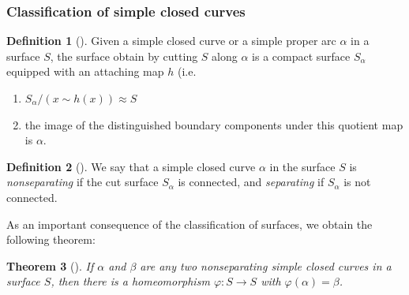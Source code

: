 \documentclass[reqno]{amsart}
\newtheorem{theorem}{Theorem}[section]
\theoremstyle{definition}
\newtheorem{definition}[theorem]{Definition}
\theoremstyle{remark}
\begin{document}
\subsubsection{Classification of simple closed curves}

\begin{definition}[]
    Given a simple closed curve or
    a simple proper arc $\alpha$ in a surface $S$,
    the surface obtain by cutting $S$ along $\alpha$ is
    a compact surface $S_{\alpha}$ equipped with an attaching
    map $h$ (i.e.
    \begin{enumerate}
        \item $S_{\alpha} / \left( x \sim h(x) \right) 
            \approx S$ 
        \item the image of the distinguished boundary components
            under this quotient map is $\alpha$.
    \end{enumerate}
\end{definition}

\begin{definition}[]
    We say that a simple closed curve $\alpha$ in the surface
    $S$ is \textit{nonseparating} if the cut surface
    $S_{\alpha}$ is connected, and \textit{separating} if
    $S_{\alpha}$ is not connected.
\end{definition}


As an important consequence of the classification of surfaces, we
obtain the following theorem:

\begin{theorem}[]
    If $\alpha$ and $\beta$ are any two nonseparating simple
    closed curves in a surface $S$, then there
    is a homeomorphism $\varphi \colon S \to S$ with
    $\varphi \left( \alpha \right) = \beta$.
\end{theorem}
\end{document}
